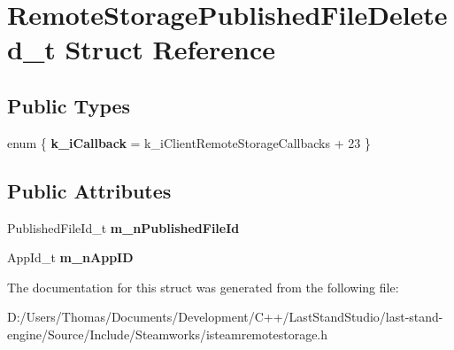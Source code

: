 \hypertarget{structRemoteStoragePublishedFileDeleted__t}{}\section{Remote\+Storage\+Published\+File\+Deleted\+\_\+t Struct Reference}
\label{structRemoteStoragePublishedFileDeleted__t}
\subsection*{Public Types}
\begin{DoxyCompactItemize}
\item 
\hypertarget{structRemoteStoragePublishedFileDeleted__t_a6d5baec85d00fca0f693e58abe863c45}{}enum \{ {\bfseries k\+\_\+i\+Callback} = k\+\_\+i\+Client\+Remote\+Storage\+Callbacks + 23
 \}\label{structRemoteStoragePublishedFileDeleted__t_a6d5baec85d00fca0f693e58abe863c45}

\end{DoxyCompactItemize}
\subsection*{Public Attributes}
\begin{DoxyCompactItemize}
\item 
\hypertarget{structRemoteStoragePublishedFileDeleted__t_a442ac889c73b2fdec3c5c8d869a64f55}{}Published\+File\+Id\+\_\+t {\bfseries m\+\_\+n\+Published\+File\+Id}\label{structRemoteStoragePublishedFileDeleted__t_a442ac889c73b2fdec3c5c8d869a64f55}

\item 
\hypertarget{structRemoteStoragePublishedFileDeleted__t_ad6e7bbba612fd635fa5a60ebd7c45528}{}App\+Id\+\_\+t {\bfseries m\+\_\+n\+App\+I\+D}\label{structRemoteStoragePublishedFileDeleted__t_ad6e7bbba612fd635fa5a60ebd7c45528}

\end{DoxyCompactItemize}


The documentation for this struct was generated from the following file\+:\begin{DoxyCompactItemize}
\item 
D\+:/\+Users/\+Thomas/\+Documents/\+Development/\+C++/\+Last\+Stand\+Studio/last-\/stand-\/engine/\+Source/\+Include/\+Steamworks/isteamremotestorage.\+h\end{DoxyCompactItemize}
